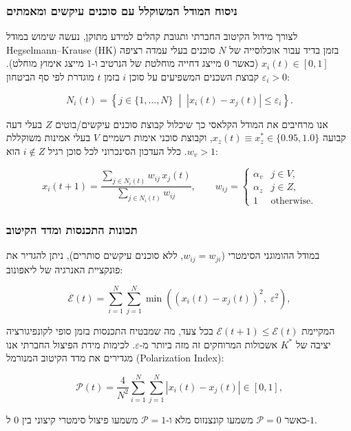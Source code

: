 \subsubsection{ניסוח המודל המשוקלל עם סוכנים עיקשים ומאמתים}
לצורך מידול הקיטוב החברתי ותגובת קהלים למידע מתוקן, נעשה שימוש במודל \textenglish{Hegselmann--Krause (HK)} בזמן בדיד עבור אוכלוסייה של $N$ סוכנים בעלי עמדה רציפה $x_i(t) \in [0, 1]$ (כאשר $0$ מייצג דחייה מוחלטת של הנרטיב ו-$1$ מייצג אימוץ מוחלט). קבוצת השכנים המשפיעים על סוכן $i$ בזמן $t$ מוגדרת לפי סף הביטחון $\varepsilon_i > 0$:
\begin{english}
\begin{equation}
N_i(t) = \left\{ j \in \{1,\dots,N\} \;\middle|\; |x_i(t) - x_j(t)| \le \varepsilon_i \right\}.
\label{eq:hk-neighbors}
\end{equation}
\end{english}
אנו מרחיבים את המודל הקלאסי כך שיכלול קבוצת סוכנים עיקשים/בוטים $Z$ בעלי דעה קבועה $x_z(t) \equiv x_z^* \in \{0.95, 1.0\}$, וקבוצת סוכני אימות רשמיים $V$ בעלי אמינות משוקללת $w_v > 1$. כלל העדכון הסינכרוני לכל סוכן רגיל $i \notin Z$ הוא:
\begin{english}
\begin{equation}
x_i(t+1) = \frac{\sum_{j \in N_i(t)} w_{ij}\, x_j(t)}{\sum_{j \in N_i(t)} w_{ij}}, \qquad
w_{ij} = \begin{cases}
\alpha_v & j \in V, \\
\alpha_z & j \in Z, \\
1 & \text{otherwise}.
\end{cases}
\label{eq:hk-weighted}
\end{equation}
\end{english}

\subsubsection{תכונות התכנסות ומדד הקיטוב}
במודל ההומוגני הסימטרי ($w_{ij}=w_{ji}$, ללא סוכנים עיקשים סותרים), ניתן להגדיר את פונקציית האנרגיה של ליאפונוב:
\begin{english}
\begin{equation}
\mathcal{E}(t) = \sum_{i=1}^{N}\sum_{j=1}^{N} \min\!\left((x_i(t) - x_j(t))^2,\; \varepsilon^2\right),
\label{eq:hk-lyapunov}
\end{equation}
\end{english}
המקיימת $\mathcal{E}(t+1) \le \mathcal{E}(t)$ בכל צעד, מה שמבטיח התכנסות בזמן סופי לקונפיגורציה יציבה של $K^*$ אשכולות המרוחקים זה מזה ביותר מ-$\varepsilon$. לכימות מידת הפיצול החברתי אנו מגדירים את מדד הקיטוב המנורמל (\textenglish{Polarization Index}):
\begin{english}
\begin{equation}
\mathcal{P}(t) = \frac{4}{N^2} \sum_{i=1}^{N}\sum_{j=1}^{N} |x_i(t) - x_j(t)| \in [0, 1],
\label{eq:hk-polarization}
\end{equation}
\end{english}
כאשר $\mathcal{P}=0$ משמעו קונצנזוס מלא ו-$\mathcal{P}=1$ משמעו פיצול סימטרי קיצוני בין $0$ ל-$1$.


